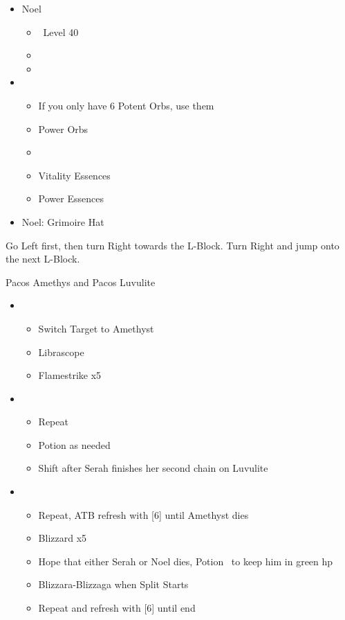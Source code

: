 \begin{menu}
\begin{itemize}
	\crystarium
	\begin{itemize}
		\item Noel
		\begin{itemize}
			\item \sen\ Level 40
			\item {}
			\item {}
		\end{itemize}
		\item \chu
		\begin{itemize}
			\item If you only have 6 Potent Orbs, use them
			\item Power Orbs
			\item {}
			\item Vitality Essences
			\item Power Essences
		\end{itemize}
	\end{itemize}
	\equip
	\begin{itemize}
		\item Noel: Grimoire Hat
	\end{itemize}
\end{itemize}
\end{menu}

Go Left first, then turn Right towards the L-Block. Turn Right and jump onto the next L-Block.

\begin{battle}{Pacos Amethys and Pacos Luvulite}
\begin{flushleft}
\begin{itemize}
	\item \sixth
	\begin{itemize}
		\item Switch Target to Amethyst
		\item Librascope
		\item Flamestrike x5
	\end{itemize}
	\item \third
	\begin{itemize}
		\item Repeat
		\item Potion as needed
		\item Shift after Serah finishes her second chain on Luvulite
	\end{itemize}
	\item \fifth
	\begin{itemize}
		\item Repeat, ATB refresh with [6] until Amethyst dies
		\item Blizzard x5
		\item Hope that either Serah or Noel dies, Potion \chu\ to keep him in green hp
		\item Blizzara-Blizzaga when Split Starts
		\item Repeat and refresh with [6] until end
	\end{itemize}
\end{itemize}
\end{flushleft}
\end{battle}

